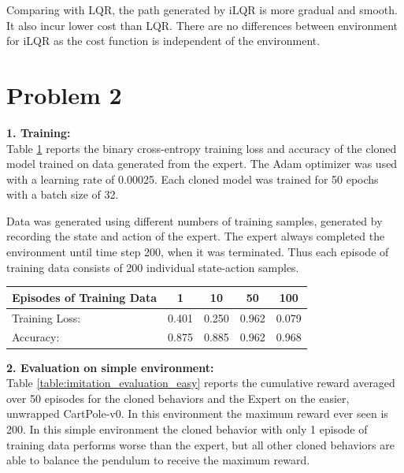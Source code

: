 \documentclass[hidelinks]{scrartcl}
\newcommand{\Lbf}[1]{{\noindent \Large{\textbf{#1}}}}
\begin{document}
Comparing with LQR, the path generated by iLQR is more gradual and smooth. It also incur lower cost than LQR. There are no differences between environment for iLQR as the cost function is independent of the environment.



\newpage
\section*{Problem 2}

\Lbf{1. Training:}\\
Table \ref{table:imitation_training} reports the binary cross-entropy training loss and accuracy of the cloned model trained on data generated from the expert.
The Adam optimizer was used with a learning rate of 0.00025.
Each cloned model was trained for 50 epochs with a batch size of 32.

Data was generated using different numbers of training samples, generated by recording the state and action of the expert.
The expert always completed the environment until time step 200, when it was terminated.
Thus each episode of training data consists of 200 individual state-action samples.

\begin{table}[h]
  \centering
  \begin{tabular}{| l | c | c | c | c |}
    \hline
    Episodes of Training Data & 1 & 10 & 50 & 100
    \\
    \hline
    Training Loss: & 0.401 & 0.250 & 0.962 & 0.079 \\
    \hline
    Accuracy: & 0.875 & 0.885 & 0.962 & 0.968 \\
    \hline
  \end{tabular}
  \label{table:imitation_training}
\end{table}


\Lbf{2. Evaluation on simple environment:}\\
Table \ref{table:imitation_evaluation_easy} reports the cumulative reward averaged over 50 episodes for the cloned behaviors and the Expert on the easier, unwrapped CartPole-v0.
In this environment the maximum reward ever seen is 200.
In this simple environment the cloned behavior with only 1 episode of training data performs worse than the expert, but all other cloned behaviors are able to balance the pendulum to receive the maximum reward.
\end{document}
